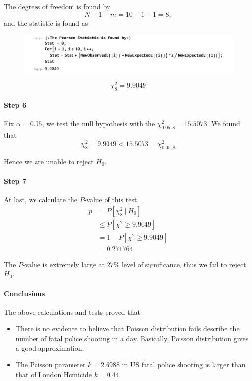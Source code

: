 \documentclass[a4paper]{article}
\begin{document}
The degrees of freedom is found by 
$$N-1-m=10-1-1=8,$$
and the statistic is found as
\begin{figure}[!htbp]
\centering
\includegraphics[width=1\linewidth]{dataprocess3.png}
\end{figure}
$$\chi_{8}^2 = 9.9049$$

\paragraph{Step 6} Fix $\alpha=0.05$, we test the null hypothesis with the $\chi^2_{0.05,8}=15.5073$. We found that
$$\chi_{8}^2 = 9.9049<15.5073=\chi^2_{0.05,8}$$

Hence we are unable to reject $H_0$.

\paragraph{Step 7} At last, we calculate the $P$-value of this test.
\begin{align*}
p &= P[\chi_{8}^2\ |\ H_0]\\
&\leq P[\chi^2\geq 9.9049] \\
&= 1-P[\chi^2\geq 9.9049]\\
&= 0.271764
\end{align*}

The $P$-value is extremely large at $27\%$ level of significance, thus we fail to reject $H_0$.

\paragraph{Conclusions}
The above calculations and tests proved that 
\begin{itemize}
\item There is no evidence to believe that Poisson distribution fails describe the number of fatal police shooting in a day. Basically, Poisson distribution gives a good approximation.
\item The Poisson parameter $k=2.6988$ in US fatal police shooting is larger than that of London Homicide $k=0.44$.
\end{itemize}
\end{document}
